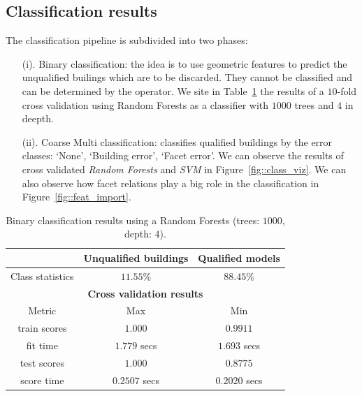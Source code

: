 \documentclass[../main.tex]{subfile}
\begin{document}
    \subsection{Classification results}

    The classification pipeline is subdivided into two phases:

    \begin{itemize}
        \item[(i).] Binary classification: the idea is to use geometric features to predict the unqualified builings which are to be discarded. They cannot be classified and can be determined by the operator. We site in Table~\ref{tab::binary_rf_1000_4} the results of a $10$-fold cross validation using Random Forests as a classifier with $1000$ trees and $4$ in deepth.

        \item[(ii).] Coarse Multi classification: classifies qualified buildings by the error classes: `None', `Building error', `Facet error'. We can observe the results of cross validated \textit{Random Forests} and \textit{SVM} in Figure~\ref{fig::class_viz}. We can also observe how facet relations play a big role in the classification in Figure~\ref{fig::feat_import}.
    \end{itemize}

    \begin{table}[H]
        \caption{\label{tab::binary_rf_1000_4}Binary classification results using a Random Forests (trees: $1000$, depth: $4$).}
        \begin{tabular}{c c c}
            \toprule
             & \textbf{Unqualified buildings} & \textbf{Qualified models} \\
            \midrule
            Class statistics & $11.55$\% & $88.45$\% \\
            \midrule
            \midrule
            \multicolumn{3}{c}{\textbf{Cross validation results}}\\
            \midrule
            Metric & Max & Min \\
             \midrule
            train scores & $1.000$ & $0.9911$ \\
             \midrule
            fit time & $1.779$ secs & $1.693$ secs \\
             \midrule
            test scores & $1.000$ & $0.8775$\\
             \midrule
            score time & $0.2507$ secs & $0.2020$ secs\\
             \bottomrule
        \end{tabular}
    \end{table}
\end{document}
